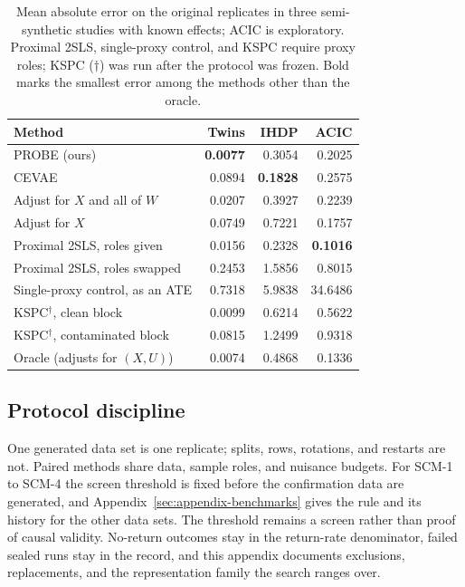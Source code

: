 \begin{table}[t]
\caption{Mean absolute error on the original replicates in three semi-synthetic studies with known effects; ACIC is exploratory. Proximal 2SLS, single-proxy control, and KSPC require proxy roles; KSPC ($\dagger$) was run after the protocol was frozen. Bold marks the smallest error among the methods other than the oracle.}
\label{tab:benchmarks}
\centering
\footnotesize
\begin{tabular}{lrrr}
\toprule
Method & Twins & IHDP & ACIC \\
\midrule
PROBE (ours) & \textbf{0.0077} & 0.3054 & 0.2025 \\
CEVAE & 0.0894 & \textbf{0.1828} & 0.2575 \\
Adjust for $X$ and all of $W$ & 0.0207 & 0.3927 & 0.2239 \\
Adjust for $X$ & 0.0749 & 0.7221 & 0.1757 \\
Proximal 2SLS, roles given & 0.0156 & 0.2328 & \textbf{0.1016} \\
Proximal 2SLS, roles swapped & 0.2453 & 1.5856 & 0.8015 \\
Single-proxy control, as an ATE & 0.7318 & 5.9838 & 34.6486 \\
KSPC$^\dagger$, clean block & 0.0099 & 0.6214 & 0.5622 \\
KSPC$^\dagger$, contaminated block & 0.0815 & 1.2499 & 0.9318 \\
\midrule
Oracle (adjusts for $(X,U)$) & 0.0074 & 0.4868 & 0.1336 \\
\bottomrule
\end{tabular}
\end{table}

\subsection{Protocol discipline}

One generated data set is one replicate; splits, rows, rotations, and restarts are not. Paired methods share data, sample roles, and nuisance budgets. For SCM-1 to SCM-4 the screen threshold is fixed before the confirmation data are generated, and Appendix~\ref{sec:appendix-benchmarks} gives the rule and its history for the other data sets. The threshold remains a screen rather than proof of causal validity. No-return outcomes stay in the return-rate denominator, failed sealed runs stay in the record, and this appendix documents exclusions, replacements, and the representation family the search ranges over.

